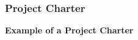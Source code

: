 \documentclass[aspectratio=169]{beamer}
\begin{document}
\begin{frame}
\frametitle{Project Charter}
\textbf{Example of a Project Charter}
\vspace{-0.2cm}
\begin{columns}
\begin{figure}
\end{figure}
\begin{figure}

\end{figure}
\end{columns}
\end{frame}
\end{document}
